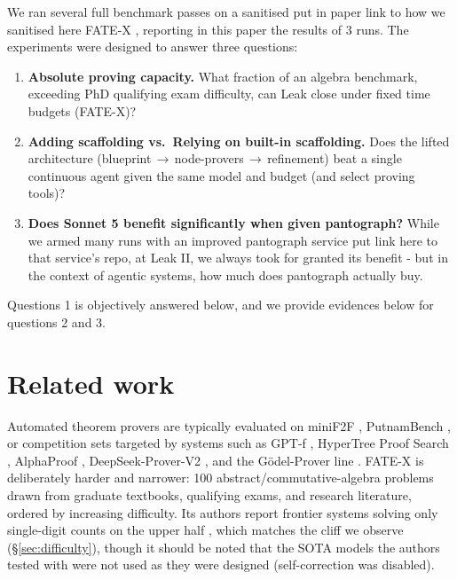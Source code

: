 \documentclass[12pt, a4paper]{article}
\begin{document}
We ran several full benchmark passes on a sanitised {put in paper link to how we sanitised here} FATE-X
\cite{fatex2025,benchmarklist_fatex}, reporting in this paper the results of 3 runs. The experiments were designed to answer three questions:

\begin{enumerate}[itemsep=1pt]
  \item \textbf{Absolute proving capacity.} What fraction of an algebra
        benchmark, exceeding PhD qualifying exam difficulty,
        can Leak close under fixed time budgets (FATE-X)?
  \item \textbf{Adding scaffolding vs.\ Relying on built-in scaffolding.} Does the lifted architecture
        (blueprint\,$\to$\,node-provers\,$\to$\,refinement) beat a
        single continuous agent given the same model and budget (and select proving tools)?
  \item \textbf{Does Sonnet 5 benefit significantly when given pantograph?} While we armed many runs
        with an improved pantograph service {put link here to that service's repo, at Leak II}, 
        we always took for granted its benefit - but in the context of agentic systems, how much
        does pantograph actually buy.
\end{enumerate}

Questions 1 is objectively answered below, and we provide evidences below for questions 2 and 3.

\section{Related work}

Automated theorem provers are typically evaluated on miniF2F
\cite{zheng2022minif2f}, PutnamBench \cite{tsoukalas2024putnambench}, or
competition sets targeted by systems such as GPT-f \cite{polu2020gptf},
HyperTree Proof Search \cite{lample2022hypertree}, AlphaProof
\cite{alphaproof2024}, DeepSeek-Prover-V2 \cite{deepseekproverv2}, and the
G\"odel-Prover line \cite{davis2025goedelspoetry}. FATE-X \cite{fatex2025}
is deliberately harder and narrower: 100 abstract/commutative-algebra problems
drawn from graduate textbooks, qualifying exams, and research literature,
ordered by increasing difficulty. Its authors report frontier systems solving
only single-digit counts on the upper half \cite{benchmarklist_fatex}, which
matches the cliff we observe (\S\ref{sec:difficulty}), though it should be
noted that the SOTA models the authors tested with were not used as they were designed
(self-correction was disabled). \\
\end{document}
